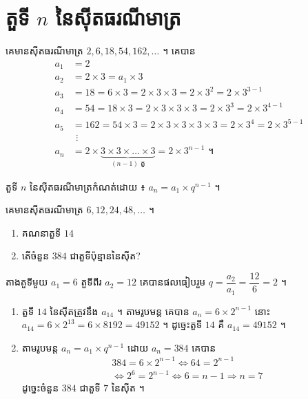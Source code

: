 \section{តួទី \texorpdfstring{$n$}{n} នៃស៊ីតធរណីមាត្រ}

\begin{example}[ឧទាហរណ៍]
គេមានស៊ីតធរណីមាត្រ $2, 6, 18, 54, 162, \ldots$ ។ គេបាន
\[
\begin{aligned}
a_1 &= 2\\
a_2 &= 2 \times 3 = a_1 \times 3\\
a_3 &= 18 = 6 \times 3 = 2 \times 3 \times 3 = 2 \times 3^2 = 2 \times 3^{3-1}\\
a_4 &= 54 = 18 \times 3 = 2 \times 3 \times 3 \times 3 = 2 \times 3^3 = 2 \times 3^{4-1}\\
a_5 &= 162 = 54 \times 3 = 2 \times 3 \times 3 \times 3 \times 3 = 2 \times 3^4 = 2 \times 3^{5-1}\\
&\ \,\vdots\\
a_n &= 2 \times \underbrace{3 \times 3 \times \ldots \times 3}_{(n-1) \text{ តួ}} = 2 \times 3^{n-1} \text{ ។}
\end{aligned}
\]
\end{example}

\begin{formulaBox}[ជាទូទៅ]
តួទី $n$ នៃស៊ីតធរណីមាត្រកំណត់ដោយ ៖ $a_n = a_1 \times q^{n-1}$ ។
\end{formulaBox}

\begin{example}[លំហាត់គំរូ ១]
គេមានស៊ីតធរណីមាត្រ $6, 12, 24, 48, \ldots$ ។
\begin{enumerate}[a]
  \item គណនាតួទី $14$
  \item តើចំនួន $384$ ជាតួទីប៉ុន្មាននៃស៊ីត?
\end{enumerate}
\end{example}
\ans
តាងតួទីមួយ $a_1 = 6$ តួទីពីរ $a_2 = 12$ គេបានផលធៀបរួម $q = \dfrac{a_2}{a_1} = \dfrac{12}{6} = 2$ ។
\begin{enumerate}[a]
  \item តួទី $14$ នៃស៊ីតត្រូវនឹង $a_{14}$ ។ តាមរូបមន្ត គេបាន $a_n = 6 \times 2^{n-1}$ នោះ $a_{14} = 6 \times 2^{13} = 6 \times 8192 = 49152$ ។ ដូច្នេះតួទី $14$ គឺ $a_{14} = 49152$ ។
  \item តាមរូបមន្ត $a_n = a_1 \times q^{n-1}$ ដោយ $a_n = 384$ គេបាន
  \[ \begin{gathered} 384 = 6 \times 2^{n-1} \iff 64 = 2^{n-1}\\ \iff 2^6 = 2^{n-1} \iff 6 = n - 1 \Rightarrow n = 7 \end{gathered} \]
  ដូច្នេះចំនួន $384$ ជាតួទី $7$ នៃស៊ីត ។
\end{enumerate}

